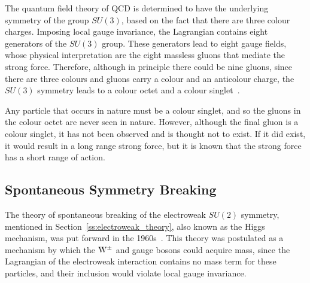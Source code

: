The quantum field theory of QCD is determined to have the underlying symmetry of the group $SU(3)$, based on
the fact that there are three colour charges. Imposing local gauge invariance, the Lagrangian contains eight
generators of the $SU(3)$ group. These generators lead to eight gauge fields, whose physical interpretation
are the eight massless gluons that mediate the strong force. Therefore, although in principle there could be
nine gluons, since there are three colours and gluons carry a colour and an anticolour charge, the $SU(3)$
symmetry leads to a colour octet and a colour singlet~\cite{Griffiths:1987tj}.

Any particle that occurs in nature must be a colour singlet, and so the gluons in the colour octet are never
seen in nature. However, although the final gluon is a colour singlet, it has not been observed and is
thought not to exist. If it did exist, it would result in a long range strong force, but it is known that the
strong force has a short range of action.

\subsection{Spontaneous Symmetry Breaking}
\label{ss:spontaneous_symmetry_breaking}

The theory of spontaneous breaking of the electroweak $SU(2)$ symmetry, mentioned in
Section~\ref{ss:electroweak_theory}, also known as the Higgs mechanism, was put forward in the
1960s~\cite{Higgs:1964pj}. This theory was postulated as a mechanism by which the $\mathrm{W}^{\pm}$ and \Z gauge
bosons could acquire mass, since the Lagrangian of the electroweak interaction contains no mass term for these
particles, and their inclusion would violate local gauge invariance.


